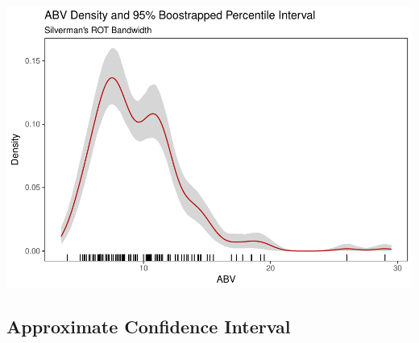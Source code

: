 \documentclass[]{article}
\begin{document}
\includegraphics{FinalReport_files/figure-latex/unnamed-chunk-13-2.pdf}

\subsection{Approximate Confidence
Interval}\label{approximate-confidence-interval}
\end{document}
